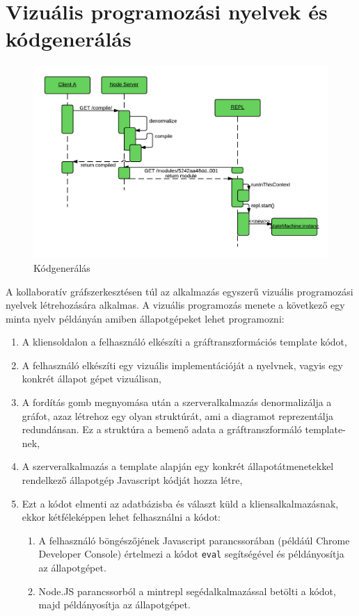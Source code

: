 \section{Vizuális programozási nyelvek és kódgenerálás}

\begin{figure}[!ht]
\centering
\includegraphics[width=15cm,keepaspectratio]{figures/compile-seq.png}
\caption{Kódgenerálás}
\label{fig:compileseq}
\end{figure}

A kollaboratív gráfszerkesztésen túl az alkalmazás egyszerű vizuális programozási nyelvek létrehozására alkalmas.
A vizuális programozás menete a következő egy minta nyelv példányán amiben állapotgépeket lehet programozni:
\begin{enumerate}
\item A kliensoldalon a felhasználó elkészíti a gráftranszformációs template kódot,
\item A felhasználó elkészíti egy vizuális implementációját a nyelvnek, vagyis egy konkrét állapot gépet vizuálisan,
\item A fordítás gomb megnyomása után a szerveralkalmazás denormalizálja a gráfot, azaz létrehoz egy olyan struktúrát, ami a diagramot reprezentálja redundánsan. Ez a struktúra a bemenő adata a gráftranszformáló template-nek,
\item A szerveralkalmazás a template alapján egy konkrét állapotátmenetekkel rendelkező állapotgép Javascript kódját hozza létre,
\item Ezt a kódot elmenti az adatbázisba és választ küld a kliensalkalmazásnak, ekkor kétféleképpen lehet felhasználni a kódot:
\begin{enumerate}
    \item A felhasználó böngészőjének Javascript parancssorában (példáúl Chrome Developer Console) értelmezi a kódot \lstinline{eval} segítségével és példányosítja az állapotgépet. 
    \item Node.JS parancssorból a mintrepl segédalkalmazással betölti a kódot, majd példányosítja az állapotgépet.
\end{enumerate}
\end{enumerate}


